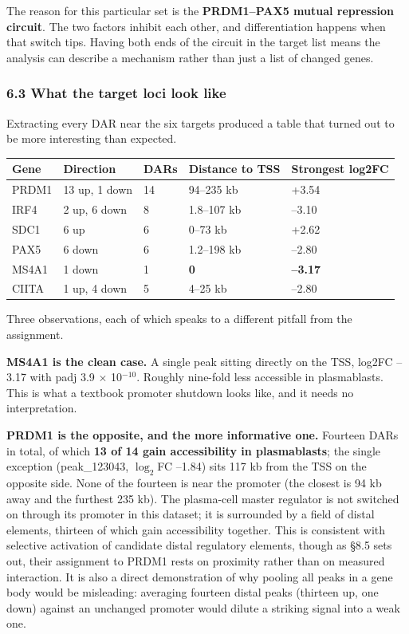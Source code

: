 \documentclass[
  11pt,
  a4paper,
]{article}
\begin{document}
The reason for this particular set is the \textbf{PRDM1--PAX5 mutual
repression circuit}. The two factors inhibit each other, and
differentiation happens when that switch tips. Having both ends of the
circuit in the target list means the analysis can describe a mechanism
rather than just a list of changed genes.

\hypertarget{what-the-target-loci-look-like}{%
\subsubsection{6.3 What the target loci look
like}\label{what-the-target-loci-look-like}}

Extracting every DAR near the six targets produced a table that turned
out to be more interesting than expected.

\begin{longtable}[]{@{}lllll@{}}
\toprule\noalign{}
Gene & Direction & DARs & Distance to TSS & Strongest log2FC \\
\midrule\noalign{}
\endhead
\bottomrule\noalign{}
\endlastfoot
PRDM1 & 13 up, 1 down & 14 & 94--235 kb & +3.54 \\
IRF4 & 2 up, 6 down & 8 & 1.8--107 kb & --3.10 \\
SDC1 & 6 up & 6 & 0--73 kb & +2.62 \\
PAX5 & 6 down & 6 & 1.2--198 kb & --2.80 \\
MS4A1 & 1 down & 1 & \textbf{0} & \textbf{--3.17} \\
CIITA & 1 up, 4 down & 5 & 4--25 kb & --2.80 \\
\end{longtable}

Three observations, each of which speaks to a different pitfall from the
assignment.

\textbf{MS4A1 is the clean case.} A single peak sitting directly on the
TSS, log2FC --3.17 with padj 3.9 \(\times\) 10\(^{-10}\). Roughly
nine-fold less accessible in plasmablasts. This is what a textbook
promoter shutdown looks like, and it needs no interpretation.

\textbf{PRDM1 is the opposite, and the more informative one.} Fourteen
DARs in total, of which \textbf{13 of 14 gain accessibility in
plasmablasts}; the single exception (peak\_123043, \(\log_2\)FC --1.84)
sits 117 kb from the TSS on the opposite side. None of the fourteen is
near the promoter (the closest is 94 kb away and the furthest 235 kb).
The plasma-cell master regulator is not switched on through its promoter
in this dataset; it is surrounded by a field of distal elements,
thirteen of which gain accessibility together. This is consistent with
selective activation of candidate distal regulatory elements, though as
§8.5 sets out, their assignment to PRDM1 rests on proximity rather than
on measured interaction. It is also a direct demonstration of why
pooling all peaks in a gene body would be misleading: averaging fourteen
distal peaks (thirteen up, one down) against an unchanged promoter would
dilute a striking signal into a weak one.
\end{document}
